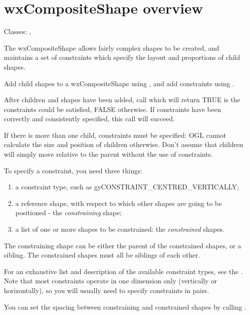 \section{wxCompositeShape overview}\label{compositeshapeoverview}

Classes: , 

The wxCompositeShape allows fairly complex shapes to be created, and maintains
a set of constraints which specify the layout and proportions of child shapes.

Add child shapes to a wxCompositeShape using , and
add constraints using .

After children and shapes have been added, call  which
will return TRUE is the constraints could be satisfied, FALSE otherwise. If
constraints have been correctly and consistently specified, this call will succeed.

If there is more than one child, constraints must be specified: OGL cannot calculate
the size and position of children otherwise. Don't assume that children will simply
move relative to the parent without the use of constraints.

To specify a constraint, you need three things:

\begin{enumerate}\itemsep=0pt
\item a constraint type, such as gyCONSTRAINT\_CENTRED\_VERTICALLY;
\item a reference shape, with respect to which other shapes are going to be positioned - the\rtfsp
{\it constraining} shape;
\item a list of one or more shapes to be constrained: the {\it constrained} shapes.
\end{enumerate}

The constraining shape can be either the parent of the constrained shapes, or a sibling. The
constrained shapes must all be siblings of each other.

For an exhaustive list and description of the available constraint types, see the .
Note that most constraints operate in one dimension only (vertically or horizontally), so you will
usually need to specify constraints in pairs.

You can set the spacing between constraining and constrained shapes by
calling .

